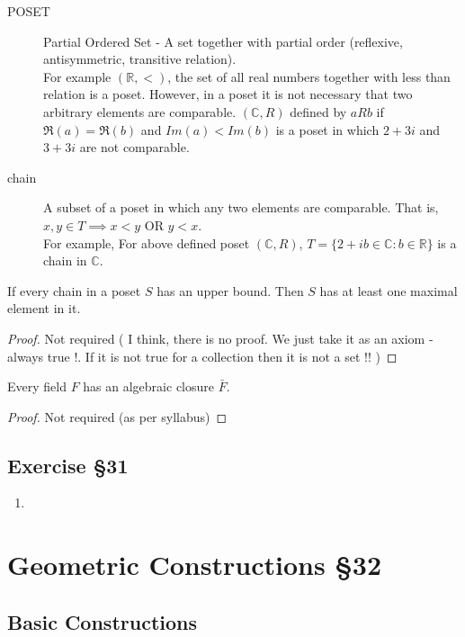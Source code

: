 \begin{description}
	\item[POSET] Partial Ordered Set - A set together with partial order (reflexive, antisymmetric, transitive relation).\\
		
	For example $(\mathbb{R},<)$, the set of all real numbers together with less than relation is a poset. However, in a poset it is not necessary that two arbitrary elements are comparable. $(\mathbb{C},R)$ defined by $aRb$ if $\Re(a) = \Re(b)$ and $Im(a) < Im(b)$ is a poset in which $2+3i$ and $3+3i$ are not comparable.
	\item[chain] A subset of a poset in which any two elements are comparable. That is, $x,y \in T \implies x < y \text{ OR } y < x$.\\

	For example, For above defined poset $(\mathbb{C},R)$, $T = \{ 2+ib \in \mathbb{C} : b \in \mathbb{R} \}$ is a chain in $\mathbb{C}$.
\end{description}
\begin{lemma}[Zorn]
	If every chain in a poset $S$ has an upper bound. Then $S$ has at least one maximal element in it.
\end{lemma}
\begin{proof}
	Not required ( I think, there is no proof. We just take it as an axiom - always true !. If it is not true for a collection then it is not a set !! )
\end{proof}
\begin{theorem}
	Every field $F$ has an algebraic closure $\bar{F}$.
\end{theorem}
\begin{proof}
	Not required (as per syllabus)
\end{proof}
\subsection{Exercise \S31}
\begin{enumerate}
	\item
\end{enumerate}

\section{Geometric Constructions \S32}
\subsection{Basic Constructions}

